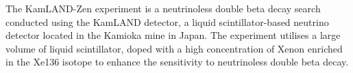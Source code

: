 









The KamLAND-Zen experiment is a neutrinoless double beta decay search conducted using the KamLAND detector, a liquid scintillator-based neutrino detector located in the Kamioka mine in Japan. The experiment utilises a large volume of liquid scintillator, doped with a high concentration of Xenon enriched in the Xe136 isotope to enhance the sensitivity to neutrinoless double beta decay.

